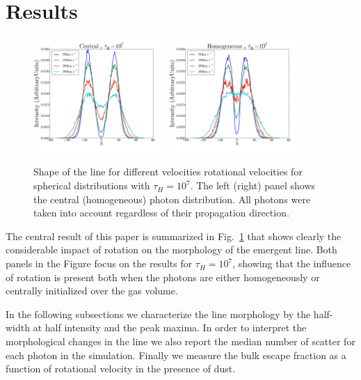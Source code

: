 \documentclass[usenatbib]{mn2e}
\newcommand{\ly}{{\ifmmode{{\rm Ly}\alpha~}\else{Ly$\alpha$~}\fi}}
\begin{document}
\section{Results}
\label{sec:results}

\begin{figure}
  \includegraphics[width=0.45\textwidth]{SpectraDifVelocitiesCentral.png}
  \includegraphics[width=0.45\textwidth]{SpectraDifVelocitiesHOM.png}
\caption{Shape of the \ly line for
    different velocities rotational velocities for spherical
    distributions with $\tau_{H}=10^{7}$. The left (right) panel shows
    the central    (homogeneous) photon distribution. All photons were
    taken into     account regardless of their propagation
    direction.    \label{fig:differentvelocities}}  
\end{figure}


The central result of this paper is summarized in
Fig.~\ref{fig:differentvelocities} that shows clearly the considerable
impact of rotation on the morphology of the emergent \ly line. Both
panels in the Figure focus on the results for $\tau_{H}=10^{7}$,
showing that the influence of rotation is present both when the
photons are either homogeneously or centrally initialized over the gas
volume. 

In the following subsections we characterize the line morphology by
the half-width at half intensity and the peak maxima. In order to
interpret the morphological changes in the line we also report the
median number of scatter for each \ly photon in the
simulation. Finally we measure the bulk escape fraction as a function
of rotational velocity in the presence of dust.
\end{document}
